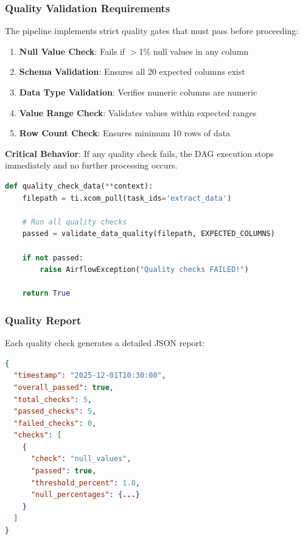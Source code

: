 \documentclass[12pt,a4paper]{article}
\begin{document}
\subsubsection{Quality Validation Requirements}

The pipeline implements strict quality gates that must pass before proceeding:

\begin{enumerate}
    \item \textbf{Null Value Check}: Fails if $>$1\% null values in any column
    \item \textbf{Schema Validation}: Ensures all 20 expected columns exist
    \item \textbf{Data Type Validation}: Verifies numeric columns are numeric
    \item \textbf{Value Range Check}: Validates values within expected ranges
    \item \textbf{Row Count Check}: Ensures minimum 10 rows of data
\end{enumerate}

\textbf{Critical Behavior}: If any quality check fails, the DAG execution stops immediately and no further processing occurs.

\begin{lstlisting}[language=Python, caption=Quality Check Implementation]
def quality_check_data(**context):
    filepath = ti.xcom_pull(task_ids='extract_data')
    
    # Run all quality checks
    passed = validate_data_quality(filepath, EXPECTED_COLUMNS)
    
    if not passed:
        raise AirflowException("Quality checks FAILED!")
    
    return True
\end{lstlisting}

\subsubsection{Quality Report}

Each quality check generates a detailed JSON report:

\begin{lstlisting}[language=json, caption=Quality Report Sample]
{
  "timestamp": "2025-12-01T10:30:00",
  "overall_passed": true,
  "total_checks": 5,
  "passed_checks": 5,
  "failed_checks": 0,
  "checks": [
    {
      "check": "null_values",
      "passed": true,
      "threshold_percent": 1.0,
      "null_percentages": {...}
    }
  ]
}
\end{lstlisting}
\end{document}
